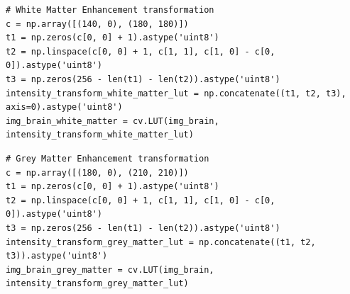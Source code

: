\documentclass[11pt]{article}
\begin{document}
        \begin{lstlisting}[style=pythonstyle]
# White Matter Enhancement transformation
c = np.array([(140, 0), (180, 180)])
t1 = np.zeros(c[0, 0] + 1).astype('uint8')
t2 = np.linspace(c[0, 0] + 1, c[1, 1], c[1, 0] - c[0, 0]).astype('uint8')
t3 = np.zeros(256 - len(t1) - len(t2)).astype('uint8')
intensity_transform_white_matter_lut = np.concatenate((t1, t2, t3), axis=0).astype('uint8')
img_brain_white_matter = cv.LUT(img_brain, intensity_transform_white_matter_lut)
        \end{lstlisting}
\newpage
        \begin{lstlisting}[style=pythonstyle]
# Grey Matter Enhancement transformation
c = np.array([(180, 0), (210, 210)])
t1 = np.zeros(c[0, 0] + 1).astype('uint8')
t2 = np.linspace(c[0, 0] + 1, c[1, 1], c[1, 0] - c[0, 0]).astype('uint8')
t3 = np.zeros(256 - len(t1) - len(t2)).astype('uint8')
intensity_transform_grey_matter_lut = np.concatenate((t1, t2, t3)).astype('uint8')
img_brain_grey_matter = cv.LUT(img_brain, intensity_transform_grey_matter_lut)
        \end{lstlisting}
\end{document}
